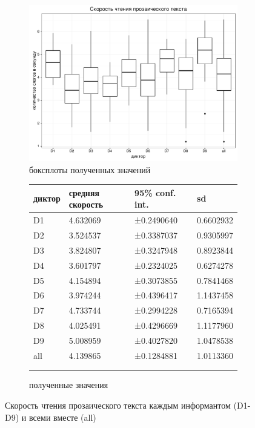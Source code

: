 \begin{figure}[t]
\begin{subfigure}[b]{0.53\textwidth}
        \includegraphics[width=\linewidth]{proseboxplot.pdf}
        \caption{боксплоты полученных значений}
\end{subfigure}
\hfill
\begin{subfigure}[b]{0.45\textwidth}
\small
\begin{tabular}{|l|l|l|l|}
\hline
диктор & средняя скорость & 95\% conf. int. & sd \\ \hline
D1 & 4.632069 & ±0.2490640 & 0.6602932 \\ \hline
D2 & 3.524537 & ±0.3387037 & 0.9305997 \\ \hline
D3 & 3.824807 & ±0.3247948 & 0.8923844 \\ \hline
D4 & 3.601797 & ±0.2324025 & 0.6274278 \\ \hline
D5 & 4.154894 & ±0.3073855 & 0.7841468 \\ \hline
D6 & 3.974244 & ±0.4396417 & 1.1437458 \\ \hline
D7 & 4.733744 & ±0.2994228 & 0.7165394 \\ \hline
D8 & 4.025491 & ±0.4296669 & 1.1177960 \\ \hline
D9 & 5.008959 & ±0.4027820 & 1.0478538 \\ \hline
all & 4.139865 & ±0.1284881 & 1.0113360 \\ \hline
\multicolumn{1}{c}{}&\multicolumn{1}{c}{}&\multicolumn{1}{c}{}&\multicolumn{1}{c}{}\\
\multicolumn{1}{c}{}&\multicolumn{1}{c}{}&\multicolumn{1}{c}{}&\multicolumn{1}{c}{}\\
\end{tabular}
\normalsize
\caption{полученные значения}        
\end{subfigure}
\caption{Скорость чтения прозаического текста каждым информантом (D1-D9) и всеми вместе (all)}
\label{proseboxplot}
\end{figure}
